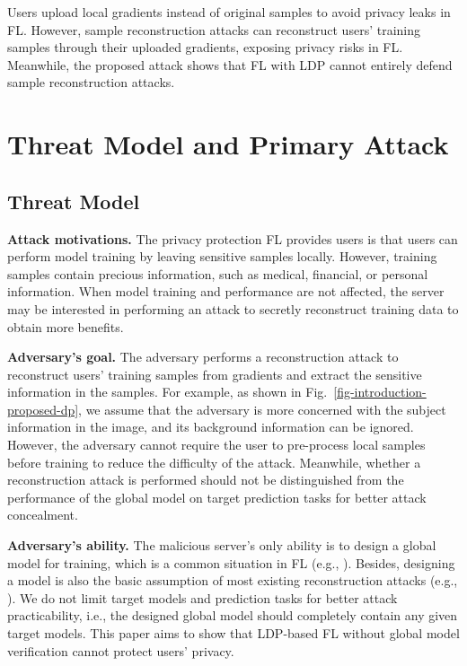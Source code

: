 \documentclass[lettersize,journal]{IEEEtran}
\begin{document}
Users upload local gradients instead of original samples to avoid privacy leaks in FL. However, sample reconstruction attacks can reconstruct users' training samples through their uploaded gradients, exposing privacy risks in FL. Meanwhile, the proposed attack shows that FL with LDP cannot entirely defend sample reconstruction attacks.

\section{Threat Model and Primary Attack}

\subsection{Threat Model}

\textbf{Attack motivations.}
The privacy protection FL provides users is that users can perform model training by leaving sensitive samples locally. However, training samples contain precious information, such as medical, financial, or personal information. When model training and performance are not affected, the server may be interested in performing an attack to secretly reconstruct training data to obtain more benefits.

\textbf{Adversary's goal.}
The adversary performs a reconstruction attack to reconstruct users' training samples from gradients and extract the sensitive information in the samples. For example, as shown in Fig.~\ref{fig-introduction-proposed-dp}, we assume that the adversary is more concerned with the subject information in the image, and its background information can be ignored. However, the adversary cannot require the user to pre-process local samples before training to reduce the difficulty of the attack. Meanwhile, whether a reconstruction attack is performed should not be distinguished from the performance of the global model on target prediction tasks for better attack concealment.

\textbf{Adversary's ability.}
The malicious server's only ability is to design a global model for training, which is a common situation in FL (e.g., \cite{Kairouz2019open, McMahan2017FedSGD, Stevens2022Efficient}). Besides, designing a model is also the basic assumption of most existing reconstruction attacks (e.g., \cite{pasquini2022eluding, Boenisch2021When, fowl2022robbing}). We do not limit target models and prediction tasks for better attack practicability, i.e., the designed global model should completely contain any given target models. This paper aims to show that LDP-based FL without global model verification cannot protect users' privacy.
\end{document}
